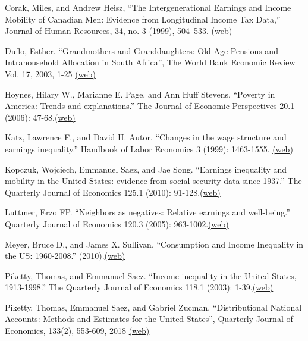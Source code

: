 \documentclass[landscape]{slides}
\begin{document}
\begin{slide}
{Corak, Miles, and Andrew Heisz, ``The Intergenerational Earnings and Income
Mobility of Canadian Men: Evidence from Longitudinal Income Tax Data,''
Journal of Human Resources, 34, no. 3 (1999), 504--533.
\href{http://www.jstor.org/stable/pdfplus/146378.pdf} {(web)}

Duflo, Esther. ``Grandmothers and Granddaughters: Old-Age Pensions and Intrahousehold Allocation in South Africa'', The World Bank Economic Review
Vol. 17, 2003, 1-25 \href{http://www.jstor.org/stable/pdfplus/3990043.pdf} {(web)}

Hoynes, Hilary W., Marianne E. Page, and Ann Huff Stevens. ``Poverty in America: Trends and explanations.'' The Journal of Economic Perspectives 20.1 (2006): 47-68.\href{http://www.nber.org/papers/w11681.pdf}{(web)}

Katz, Lawrence F., and David H. Autor. ``Changes in the wage structure and earnings inequality.'' Handbook of Labor Economics 3 (1999): 1463-1555. \href{http://elsa.berkeley.edu/~saez/course131/Katz-Autor99.pdf}{(web)}

Kopczuk, Wojciech, Emmanuel Saez, and Jae Song. ``Earnings inequality and mobility in the United States: evidence from social security data since 1937.'' The Quarterly Journal of Economics 125.1 (2010): 91-128.\href{http://elsa.berkeley.edu/~saez/kopczuk-saez-songQJE10mobility.pdf}{(web)}

Luttmer, Erzo FP. ``Neighbors as negatives: Relative earnings and well-being.'' Quarterly Journal of Economics 120.3 (2005): 963-1002.\href{http://elsa.berkeley.edu/~saez/course131/Luttmer05}{(web)}

Meyer, Bruce D., and James X. Sullivan. ``Consumption and Income Inequality in the US: 1960-2008.'' (2010).\href{http://elsa.berkeley.edu/~saez/course131/Meyer-Sullivan09}{(web)}

Piketty, Thomas, and Emmanuel Saez. ``Income inequality in the United States, 1913-1998.'' The Quarterly Journal of Economics 118.1 (2003): 1-39.\href{http://elsa.berkeley.edu/~saez/pikettyqje.pdf}{(web)}


Piketty, Thomas, Emmanuel Saez, and Gabriel Zucman,  ``Distributional National Accounts:
Methods and Estimates for the United States'', Quarterly Journal of Economics, 133(2), 553-609, 2018
\href{https://eml.berkeley.edu/~saez/PSZ2018QJE.pdf} {(web)}

}
\end{slide}
\end{document}
